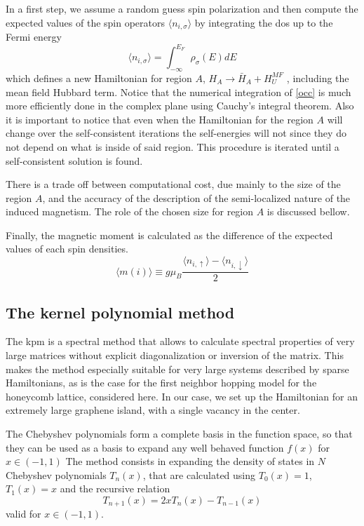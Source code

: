 In a first step, we assume a random guess spin polarization and then compute the expected values of the spin operators $\langle n_{i,\sigma} \rangle$ by integrating the \ac{dos} up to the Fermi energy
\begin{equation}
 \langle n_{i,\sigma}\rangle= \int_{-\infty}^{E_F} \rho_{\sigma}(E) dE
 \label{occ}
\end{equation}
which defines a new Hamiltonian for region $A$, $H_A \rightarrow \bar H_A + H^{MF}_U$%
, including the mean field Hubbard term.\cite{Fernandez-Rossier2007,Palacios2008} Notice that the numerical integration of \eqref{occ} is much more efficiently done in the complex plane using Cauchy's integral theorem. Also it is important to notice that even when the Hamiltonian for the region $A$ will change over the self-consistent iterations the self-energies will not since they do not depend on what is inside of said region.
This procedure is iterated until a self-consistent solution is found.

There is a trade off between computational cost, due mainly to the size of the region $A$, and the accuracy of the description of the semi-localized nature of the induced magnetism. The role of the chosen size for region $A$ is discussed bellow.

Finally, the magnetic moment is calculated as the difference of the expected values of each spin densities.
\begin{equation}
\langle m(i)\rangle \equiv g\mu_B\frac{\langle n_{i,\uparrow}\rangle-\langle n_{i,\downarrow}\rangle}{2}
\label{sz}
\end{equation}



\subsection{The kernel polynomial method}
The \acf{kpm}\cite{Weisse2006} is a spectral method that allows to calculate spectral properties of very large matrices without explicit diagonalization or inversion of the matrix.
This makes the method especially suitable for very large systems described by sparse Hamiltonians, as is the case for the first neighbor hopping model for the honeycomb lattice, considered here.
In our case, we set up the Hamiltonian for an extremely large graphene island, with a single vacancy in the center.

{The Chebyshev polynomials form a complete basis in the function space, so that they can be used as a basis to expand any well behaved function} $f(x)$ for $x\in (-1, 1)$
The method consists in expanding the density of states in $N$ Chebyshev polynomials $T_n(x)$,  that are calculated using $T_0(x)=1$, $T_1(x)=x$ and the recursive relation
\begin{equation}
T_{n+1} (x) = 2 x T_n(x) - T_{n-1} (x)
\end{equation}
valid for $x\in (-1,1)$.

